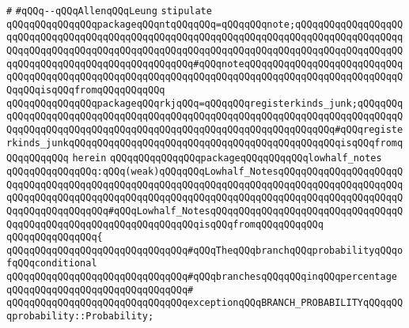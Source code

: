 \verb|#|\newline
\verb|#qQQq--qQQqAllenqQQqLeung|\newline
\newline
\newline
\verb|stipulate|\newline
\verb|qQQqqQQqqQQqqQQqpackageqQQqntqQQqqQQq=qQQqqQQqnote;qQQqqQQqqQQqqQQqqQQqqQQqqQQqqQQqqQQqqQQqqQQqqQQqqQQqqQQqqQQqqQQqqQQqqQQqqQQqqQQqqQQqqQQqqQQqqQQqqQQqqQQqqQQqqQQqqQQqqQQqqQQqqQQqqQQqqQQqqQQqqQQqqQQqqQQqqQQqqQQqqQQqqQQqqQQqqQQqqQQqqQQqqQQqqQQq#qQQqnoteqQQqqQQqqQQqqQQqqQQqqQQqqQQqqQQqqQQqqQQqqQQqqQQqqQQqqQQqqQQqqQQqqQQqqQQqqQQqqQQqqQQqqQQqqQQqqQQqqQQqqQQqisqQQqfromqQQqqQQqqQQq|\newline
\verb|qQQqqQQqqQQqqQQqpackageqQQqrkjqQQq=qQQqqQQqregisterkinds_junk;qQQqqQQqqQQqqQQqqQQqqQQqqQQqqQQqqQQqqQQqqQQqqQQqqQQqqQQqqQQqqQQqqQQqqQQqqQQqqQQqqQQqqQQqqQQqqQQqqQQqqQQqqQQqqQQqqQQqqQQqqQQqqQQqqQQqqQQq#qQQqregisterkinds_junkqQQqqQQqqQQqqQQqqQQqqQQqqQQqqQQqqQQqqQQqqQQqqQQqisqQQqfromqQQqqQQqqQQq|\newline
\verb|herein|\newline
\newline
\verb|qQQqqQQqqQQqqQQqpackageqQQqqQQqqQQqlowhalf_notes|\newline
\verb|qQQqqQQqqQQqqQQq:qQQq(weak)qQQqqQQqLowhalf_NotesqQQqqQQqqQQqqQQqqQQqqQQqqQQqqQQqqQQqqQQqqQQqqQQqqQQqqQQqqQQqqQQqqQQqqQQqqQQqqQQqqQQqqQQqqQQqqQQqqQQqqQQqqQQqqQQqqQQqqQQqqQQqqQQqqQQqqQQqqQQqqQQqqQQqqQQqqQQqqQQqqQQqqQQqqQQqqQQqqQQq#qQQqLowhalf_NotesqQQqqQQqqQQqqQQqqQQqqQQqqQQqqQQqqQQqqQQqqQQqqQQqqQQqqQQqqQQqqQQqqQQqisqQQqfromqQQqqQQqqQQq|\newline
\verb|qQQqqQQqqQQqqQQq{|\newline
\verb|qQQqqQQqqQQqqQQqqQQqqQQqqQQqqQQq#qQQqTheqQQqbranchqQQqprobabilityqQQqofqQQqconditional|\newline
\verb|qQQqqQQqqQQqqQQqqQQqqQQqqQQqqQQq#qQQqbranchesqQQqqQQqinqQQqpercentage|\newline
\verb|qQQqqQQqqQQqqQQqqQQqqQQqqQQqqQQq#|\newline
\verb|qQQqqQQqqQQqqQQqqQQqqQQqqQQqqQQqexceptionqQQqBRANCH_PROBABILITYqQQqqQQqprobability::Probability;|\newline
\newline
